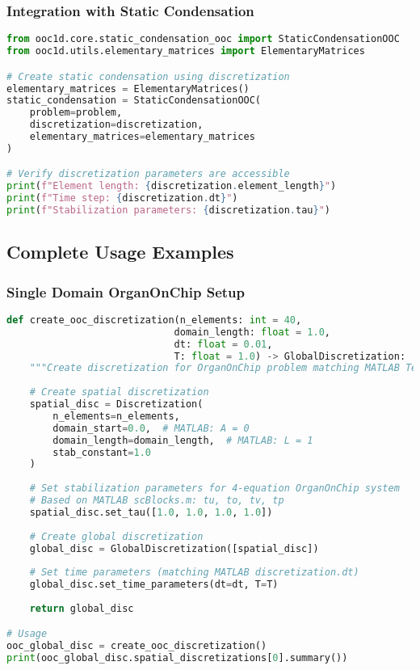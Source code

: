 \subsubsection{Integration with Static Condensation}

\begin{lstlisting}[language=Python, caption=Static Condensation Integration]
from ooc1d.core.static_condensation_ooc import StaticCondensationOOC
from ooc1d.utils.elementary_matrices import ElementaryMatrices

# Create static condensation using discretization
elementary_matrices = ElementaryMatrices()
static_condensation = StaticCondensationOOC(
    problem=problem,
    discretization=discretization,
    elementary_matrices=elementary_matrices
)

# Verify discretization parameters are accessible
print(f"Element length: {discretization.element_length}")
print(f"Time step: {discretization.dt}")
print(f"Stabilization parameters: {discretization.tau}")
\end{lstlisting}

\subsection{Complete Usage Examples}
\label{subsec:discretization_complete_examples}

\subsubsection{Single Domain OrganOnChip Setup}

\begin{lstlisting}[language=Python, caption=Complete Single Domain Setup]
def create_ooc_discretization(n_elements: int = 40,
                             domain_length: float = 1.0,
                             dt: float = 0.01,
                             T: float = 1.0) -> GlobalDiscretization:
    """Create discretization for OrganOnChip problem matching MATLAB TestProblem.m."""
    
    # Create spatial discretization
    spatial_disc = Discretization(
        n_elements=n_elements,
        domain_start=0.0,  # MATLAB: A = 0
        domain_length=domain_length,  # MATLAB: L = 1
        stab_constant=1.0
    )
    
    # Set stabilization parameters for 4-equation OrganOnChip system
    # Based on MATLAB scBlocks.m: tu, to, tv, tp
    spatial_disc.set_tau([1.0, 1.0, 1.0, 1.0])
    
    # Create global discretization
    global_disc = GlobalDiscretization([spatial_disc])
    
    # Set time parameters (matching MATLAB discretization.dt)
    global_disc.set_time_parameters(dt=dt, T=T)
    
    return global_disc

# Usage
ooc_global_disc = create_ooc_discretization()
print(ooc_global_disc.spatial_discretizations[0].summary())
\end{lstlisting}

